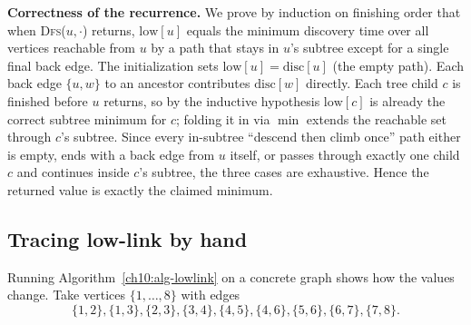 \begin{whybox}
\textbf{Correctness of the recurrence.} We prove by induction on finishing order that
when \textsc{Dfs}($u,\cdot$) returns, $\mathrm{low}[u]$ equals the minimum discovery
time over all vertices reachable from $u$ by a path that stays in $u$'s subtree except
for a single final back edge. The initialization sets $\mathrm{low}[u]=\mathrm{disc}[u]$
(the empty path). Each back edge $\{u,w\}$ to an ancestor contributes $\mathrm{disc}[w]$
directly. Each tree child $c$ is finished before $u$ returns, so by the inductive
hypothesis $\mathrm{low}[c]$ is already the correct subtree minimum for $c$; folding it
in via $\min$ extends the reachable set through $c$'s subtree. Since every in-subtree
``descend then climb once'' path either is empty, ends with a back edge from $u$
itself, or passes through exactly one child $c$ and continues inside $c$'s subtree, the
three cases are exhaustive. Hence the returned value is exactly the claimed minimum.
\end{whybox}

\subsection{Tracing low-link by hand}
\label{ch10:trace}

Running Algorithm~\ref{ch10:alg-lowlink} on a concrete graph shows how the values change.
Take vertices $\{1,\dots,8\}$ with edges
\[
  \{1,2\},\{1,3\},\{2,3\},\{3,4\},\{4,5\},\{4,6\},\{5,6\},\{6,7\},\{7,8\}.
\]

